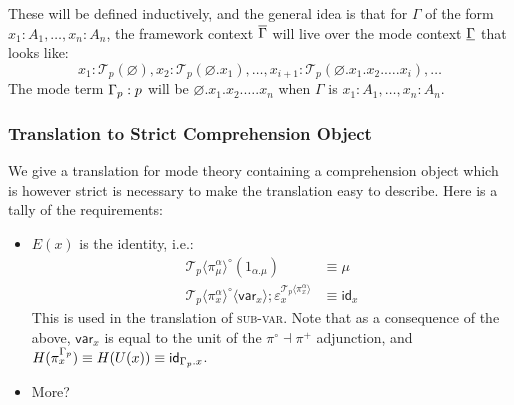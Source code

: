 \documentclass[10pt]{article}
\theoremstyle{definition}
\let\emptyset\varnothing
\newcommand\var[1]{\ensuremath{\mathsf{var}_{#1}}}
\newcommand{\id}{\mathsf{id}}
\newcommand\El[2]{\mathcal{T}_{#1}(#2)}
\newcommand\ApEl[2]{\mathcal{T}_{#1}\langle#2\rangle}
\newcommand\ap[2]{\ensuremath{#1 \langle #2 \rangle }}
\begin{document}
These will be defined inductively, and the general idea is that for $\Gamma$ of the form $x_1 : A_1, \ldots , x_n : A_n$, the framework context $\overline{\Gamma}$ will live over the mode context $\underline{\Gamma}$ that looks like:
  \[x_1 : \El{p}{\emptyset}, x_2 : \El{p}{\emptyset.x_1}, \ldots, x_{i+1} : \El{p}{\emptyset.x_1.x_2.\ldots.x_i},\ldots
  \]
  The mode term ${\Gamma}_p : p$ will be $\emptyset.x_1.x_2.\ldots.x_n$ when $\Gamma$ is $x_1 : A_1, \ldots , x_n : A_n$.

\subsubsection{Translation to Strict Comprehension Object}

We give a translation for mode theory containing a comprehension object which is however strict is necessary to make the translation easy to describe. Here is a tally of the requirements:
\begin{itemize}
\item $E(x)$ is the identity, i.e.:
\begin{align*}
\ApEl{p}{\pi^\alpha_\mu}^\circ(1_{\alpha.\mu}) &\equiv \mu \\
\ap{\ApEl{p}{\pi^\alpha_x}^\circ}{\var{x}} ; \varepsilon^{\ApEl{p}{\pi^\alpha_x}}_x &\equiv \id_x
\end{align*}
This is used in the translation of \textsc{sub-var}. Note that as a consequence of the above, $\var{x}$ is equal to the unit of the $\pi^\circ \dashv \pi^+$ adjunction, and $H(\pi^{\asdep{\Gamma}}_x) \equiv H(U(x)) \equiv \id_{\asdep{\Gamma}.x}$.
\item More?
\end{itemize}
\end{document}
